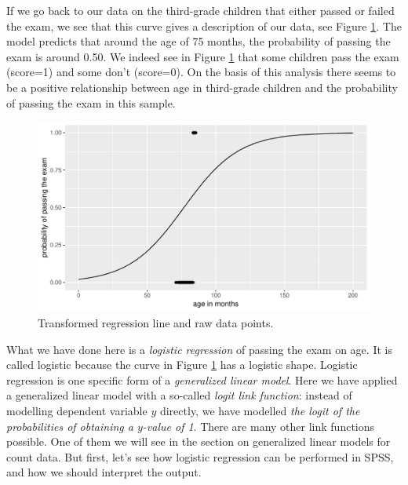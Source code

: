 \documentclass[]{book}\usepackage[]{graphicx}\usepackage[]{color}
\makeatletter
\def\maxwidth{ %
  \ifdim\Gin@nat@width>\linewidth
    \linewidth
  \else
    \Gin@nat@width
  \fi
}
\newenvironment{knitrout}{}{} %
\makeatother
\begin{document}
If we go back to our data on the third-grade children that either passed or failed the exam, we see that this curve gives a description of our data, see Figure \ref{fig:gen_11}. The model predicts that around the age of 75 months, the probability of passing the exam is around 0.50. We indeed see in Figure \ref{fig:gen_11} that some children pass the exam (score=1) and some don't (score=0). On the basis of this analysis there seems to be a positive relationship between age in third-grade children and the probability of passing the exam in this sample.

\begin{knitrout}
\color{fgcolor}\begin{figure}

{\centering \includegraphics[width=\maxwidth]{figure/gen_11-1} 

}

\caption[Transformed regression line and raw data points]{Transformed regression line and raw data points.}\label{fig:gen_11}
\end{figure}


\end{knitrout}

What we have done here is a \textit{logistic regression} of passing the exam on age. It is called logistic because the curve in Figure \ref{fig:gen_11} has a logistic shape. Logistic regression is one specific form of a \textit{generalized linear model}. Here we have applied a generalized linear model with a so-called \textit{logit link function}: instead of modelling dependent variable $y$ directly, we have modelled \textit{the logit of the probabilities of obtaining a $y$-value of 1}. There are many other link functions possible. One of them we will see in the section on generalized linear models for count data. But first, let's see how logistic regression can be performed in SPSS, and how we should interpret the output.
\end{document}
